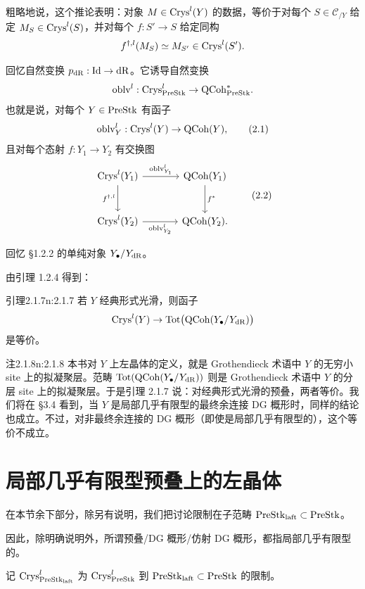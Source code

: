 粗略地说，这个推论表明：对象 $M\in\mathrm{Crys}^l(Y)$ 的数据，等价于对每个 $S\in\mathcal{C}_{/Y}$ 给定 $M_S\in\mathrm{Crys}^l(S)$，并对每个 $f:S'\to S$ 给定同构
\[
f^{\dagger,l}(M_S)\simeq M_{S'}\in\mathrm{Crys}^l(S').
\]

回忆自然变换 $p_{\mathrm{dR}}:\mathrm{Id}\to\mathrm{dR}$。它诱导自然变换
\[
\mathrm{oblv}^l:\mathrm{Crys}^l_{\mathrm{PreStk}}\to\mathrm{QCoh}^*_{\mathrm{PreStk}}.
\]
也就是说，对每个 $Y\in\mathrm{PreStk}$ 有函子
\begin{equation}
\mathrm{oblv}^l_Y:\mathrm{Crys}^l(Y)\to\mathrm{QCoh}(Y),\tag{2.1}
\end{equation}
且对每个态射 $f:Y_1\to Y_2$ 有交换图
\begin{equation}
\begin{tikzcd}[column sep=large, row sep=large]
 \Crys^l(Y_1) \arrow[r, "\oblv^l_{Y_1}"] \arrow[d, "f^{\dagger,l}"'] & \QCoh(Y_1) \arrow[d, "f^*"] \\
 \Crys^l(Y_2) \arrow[r, "\oblv^l_{Y_2}"'] & \QCoh(Y_2).
\end{tikzcd}\tag{2.2}
\end{equation}

回忆 §1.2.2 的单纯对象 $Y_\bullet/Y_{\mathrm{dR}}$。

由引理 1.2.4 得到：

\begin{othm}{引理}{2.1.7}{n:2.1.7}
若 $Y$ 经典形式光滑，则函子
\[
\mathrm{Crys}^l(Y)\to\mathrm{Tot}\big(\mathrm{QCoh}(Y_\bullet/Y_{\mathrm{dR}})\big)
\]
是等价。
\end{othm}

\begin{othm}{注}{2.1.8}{n:2.1.8}
本书对 $Y$ 上左晶体的定义，就是 Grothendieck 术语中 $Y$ 的无穷小 site 上的拟凝聚层。范畴 $\mathrm{Tot}(\mathrm{QCoh}(Y_\bullet/Y_{\mathrm{dR}}))$ 则是 Grothendieck 术语中 $Y$ 的分层 site 上的拟凝聚层。于是引理 2.1.7 说：对经典形式光滑的预叠，两者等价。我们将在 §3.4 看到，当 $Y$ 是局部几乎有限型的最终余连接 DG 概形时，同样的结论也成立。不过，对非最终余连接的 DG 概形（即使是局部几乎有限型的），这个等价不成立。
\end{othm}

\section{局部几乎有限型预叠上的左晶体}

在本节余下部分，除另有说明，我们把讨论限制在子范畴 $\mathrm{PreStk}_{\mathrm{laft}}\subset\mathrm{PreStk}$。

因此，除明确说明外，所谓预叠/DG 概形/仿射 DG 概形，都指局部几乎有限型的。

记 $\mathrm{Crys}^l_{\mathrm{PreStk}_{\mathrm{laft}}}$ 为 $\mathrm{Crys}^l_{\mathrm{PreStk}}$ 到 $\mathrm{PreStk}_{\mathrm{laft}}\subset\mathrm{PreStk}$ 的限制。


